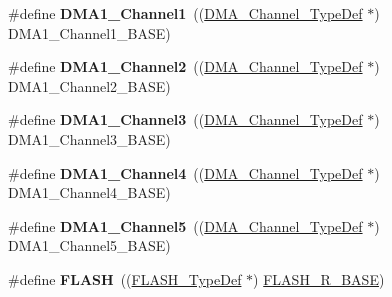 \begin{DoxyCompactItemize}
\item 
\mbox{\label{group___peripheral__declaration_gac83c5be824be1c02716e2522e80ddf7a}} 
\#define {\bfseries D\+M\+A1\+\_\+\+Channel1}~((\hyperlink{struct_d_m_a___channel___type_def}{D\+M\+A\+\_\+\+Channel\+\_\+\+Type\+Def} $\ast$) D\+M\+A1\+\_\+\+Channel1\+\_\+\+B\+A\+SE)
\item 
\mbox{\label{group___peripheral__declaration_ga23d7631dd10c645e06971b2543ba2949}} 
\#define {\bfseries D\+M\+A1\+\_\+\+Channel2}~((\hyperlink{struct_d_m_a___channel___type_def}{D\+M\+A\+\_\+\+Channel\+\_\+\+Type\+Def} $\ast$) D\+M\+A1\+\_\+\+Channel2\+\_\+\+B\+A\+SE)
\item 
\mbox{\label{group___peripheral__declaration_gacf7b6093a37b306d7f1f50b2f200f0d0}} 
\#define {\bfseries D\+M\+A1\+\_\+\+Channel3}~((\hyperlink{struct_d_m_a___channel___type_def}{D\+M\+A\+\_\+\+Channel\+\_\+\+Type\+Def} $\ast$) D\+M\+A1\+\_\+\+Channel3\+\_\+\+B\+A\+SE)
\item 
\mbox{\label{group___peripheral__declaration_gad2c42743316bf64da557130061b1f56a}} 
\#define {\bfseries D\+M\+A1\+\_\+\+Channel4}~((\hyperlink{struct_d_m_a___channel___type_def}{D\+M\+A\+\_\+\+Channel\+\_\+\+Type\+Def} $\ast$) D\+M\+A1\+\_\+\+Channel4\+\_\+\+B\+A\+SE)
\item 
\mbox{\label{group___peripheral__declaration_ga06ff98ddef3c962795d2e2444004abff}} 
\#define {\bfseries D\+M\+A1\+\_\+\+Channel5}~((\hyperlink{struct_d_m_a___channel___type_def}{D\+M\+A\+\_\+\+Channel\+\_\+\+Type\+Def} $\ast$) D\+M\+A1\+\_\+\+Channel5\+\_\+\+B\+A\+SE)
\item 
\mbox{\label{group___peripheral__declaration_ga844ea28ba1e0a5a0e497f16b61ea306b}} 
\#define {\bfseries F\+L\+A\+SH}~((\hyperlink{struct_f_l_a_s_h___type_def}{F\+L\+A\+S\+H\+\_\+\+Type\+Def} $\ast$) \hyperlink{group___peripheral__memory__map_ga8e21f4845015730c5731763169ec0e9b}{F\+L\+A\+S\+H\+\_\+\+R\+\_\+\+B\+A\+SE})
\item 
\mbox{\label{group___peripheral__declaration_gad2d5f875cdc6d696735f20fa23a895c3}} 

\end{DoxyCompactItemize}
